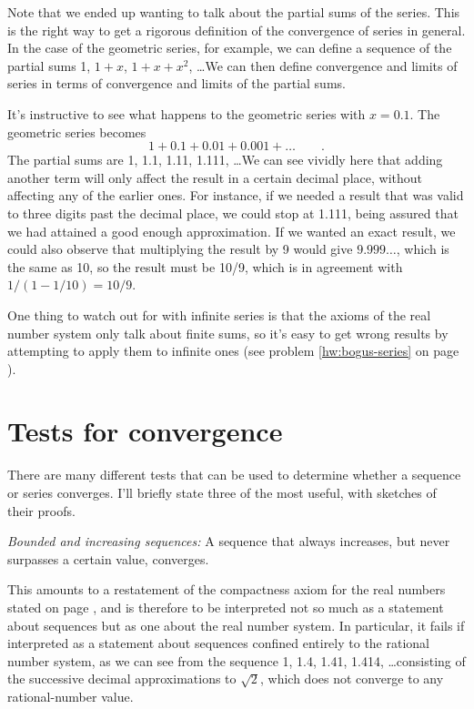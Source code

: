 Note that we ended up wanting to talk about the partial sums of the series. This is the right way to get a rigorous definition of
the convergence of series in general.
In the case of the geometric series, for example,
we can define a sequence of the
partial sums 1, $1+x$, $1+x+x^2$, \ldots We can then define convergence and limits of series in terms of convergence and limits
of the partial sums.

It's instructive to see what happens to the geometric series with $x=0.1$. The geometric series becomes\label{geometric-tenths}
\begin{equation*}
  1 + 0.1 + 0.01 + 0.001 + \ldots \qquad .
\end{equation*}
The partial sums are 1, 1.1, 1.11, 1.111, \ldots We can see vividly here that adding another term will only affect
the result in a certain decimal place, without affecting any of the earlier ones. For instance, if we needed a
result that was valid to three digits past the decimal place, we could stop at 1.111, being assured that we had
attained a good enough approximation. If we wanted an exact result, we could also observe that multiplying the
result by 9 would give $9.999\ldots$, which is the same as 10, so the result must be 10/9, which is in agreement
with $1/(1-1/10)=10/9$.

One thing to watch out for with infinite series is that
the axioms of the real number system only talk about finite sums, so it's easy to get wrong results
by attempting to apply them to infinite ones (see problem
\ref{hw:bogus-series} on page \pageref{hw:bogus-series}).\label{infinite-sum-warning}

\section{Tests for convergence}

There are many different tests that can be used to determine whether a sequence or series converges.
I'll briefly state three of the most useful, with sketches of their proofs.

\emph{Bounded and increasing sequences\/:} A sequence that always increases, but never
surpasses a certain value, converges.

This amounts to a restatement of the compactness axiom for the real numbers stated on page \pageref{compactness},
and is therefore to be interpreted not so much as a statement about sequences but as one about the
real number system. In particular, it fails if interpreted as a statement about sequences confined entirely to the rational number system, as we can see from the
sequence 1, 1.4, 1.41, 1.414, \ldots consisting of the successive decimal approximations to $\sqrt{2}$,
which does not converge to any rational-number value.


